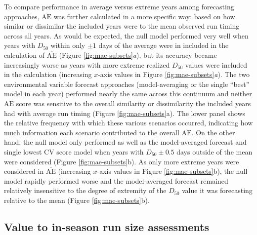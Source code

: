 \documentclass[12pt,]{book}
\theoremstyle{definition}
\theoremstyle{definition}
\theoremstyle{definition}
\theoremstyle{remark}
\begin{document}
To compare performance in average versus extreme years among forecasting
approaches, \(\overline{\text{AE}}\) was further calculated in a more
specific way: based on how similar or dissimilar the included years were
to the mean observed run timing across all years. As would be expected,
the null model performed very well when years with \(D_{50}\) within
only \(\pm 1\) days of the average were in included in the calculation
of \(\overline{\text{AE}}\) (Figure \ref{fig:mae-subsets}\emph{a}), but
its accuracy became increasingly worse as years with more extreme
realized \(D_{50}\) values were included in the calculation (increasing
\(x\)-axis values in Figure \ref{fig:mae-subsets}\emph{a}). The two
environmental variable forecast approaches (model-averaging or the
single ``best'' model in each year) performed nearly the same across
this continuum and neither \(\overline{\text{AE}}\) score was sensitive
to the overall similarity or dissimilarity the included years had with
average run timing (Figure \ref{fig:mae-subsets}a). The lower panel
shows the relative frequency with which these various scenarios
occurred, indicating how much information each scenario contributed to
the overall \(\overline{\text{AE}}\). On the other hand, the null model
only performed as well as the model-averaged forecast and single lowest
CV score model when years with \(D_{50} \pm 0.5\) days outside of the
mean were considered (Figure \ref{fig:mae-subsets}b). As only more
extreme years were considered in \(\overline{\text{AE}}\) (increasing
\(x\)-axis values in Figure \ref{fig:mae-subsets}b), the null model
rapidly performed worse and the model-averaged forecast remained
relatively insensitive to the degree of extremity of the \(D_{50}\)
value it was forecasting relative to the mean (Figure
\ref{fig:mae-subsets}b).

\subsection{Value to in-season run size
assessments}\label{value-to-in-season-run-size-assessments}
\end{document}
